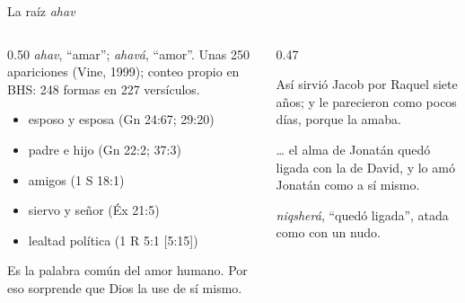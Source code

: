\begin{frame}{La raíz \emph{ahav}}
\begin{columns}[t,onlytextwidth]
\begin{column}{0.50\textwidth}\small
{} \emph{ahav}, ``amar'';  \emph{ahavá}, ``amor''. Unas 250 apariciones (Vine, 1999); conteo propio en BHS: 248 formas en 227 versículos.
\begin{itemize}
\item esposo y esposa (Gn 24:67; 29:20)
\item padre e hijo (Gn 22:2; 37:3)
\item amigos (1 S 18:1)
\item siervo y señor (Éx 21:5)
\item lealtad política (1 R 5:1 [5:15])
\end{itemize}
\scriptsize Es la palabra común del amor humano. Por eso sorprende que Dios la use de sí mismo.
\end{column}
\begin{column}{0.47\textwidth}
\begin{cita}Así sirvió Jacob por Raquel siete años; y le parecieron como pocos días, porque la amaba.\end{cita}
\begin{cita}\ldots{} el alma de Jonatán quedó ligada con la de David, y lo amó Jonatán como a sí mismo.\end{cita}
\scriptsize{} \emph{niqsherá}, ``quedó ligada'', atada como con un nudo.
\end{column}
\end{columns}
\end{frame}

